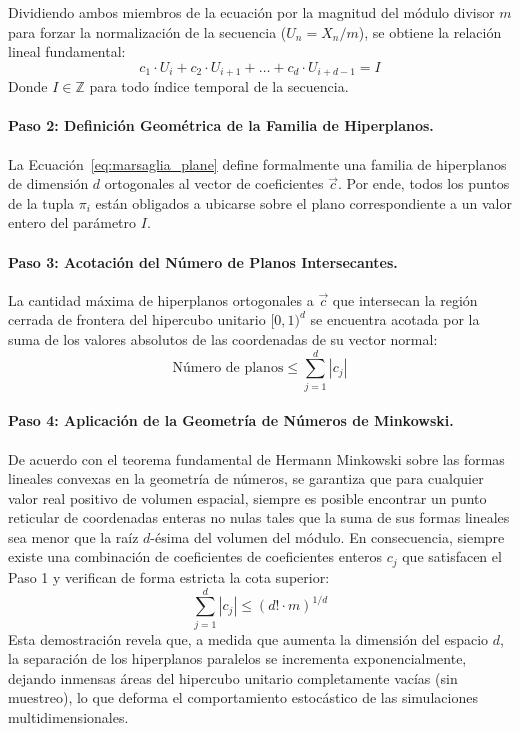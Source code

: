 \documentclass{article}
\begin{document}
Dividiendo ambos miembros de la ecuación por la magnitud del módulo divisor $m$ para forzar la normalización de la secuencia ($U_n = X_n / m$), se obtiene la relación lineal fundamental:
\begin{equation}
    c_1 \cdot U_i + c_2 \cdot U_{i+1} + \dots + c_d \cdot U_{i+d-1} = I
\label{eq:marsaglia_plane}
\end{equation}
Donde $I \in \mathbb{Z}$ para todo índice temporal de la secuencia.

\paragraph{Paso 2: Definición Geométrica de la Familia de Hiperplanos.}
La Ecuación~\ref{eq:marsaglia_plane} define formalmente una familia de hiperplanos de dimensión $d$ ortogonales al vector de coeficientes $\vec{c}$. Por ende, todos los puntos de la tupla $\pi_i$ están obligados a ubicarse sobre el plano correspondiente a un valor entero del parámetro $I$.

\paragraph{Paso 3: Acotación del Número de Planos Intersecantes.}
La cantidad máxima de hiperplanos ortogonales a $\vec{c}$ que intersecan la región cerrada de frontera del hipercubo unitario $[0, 1)^d$ se encuentra acotada por la suma de los valores absolutos de las coordenadas de su vector normal:
\begin{equation}
    \text{Número de planos} \le \sum_{j=1}^d |c_j|
\end{equation}

\paragraph{Paso 4: Aplicación de la Geometría de Números de Minkowski.}
De acuerdo con el teorema fundamental de Hermann Minkowski sobre las formas lineales convexas en la geometría de números, se garantiza que para cualquier valor real positivo de volumen espacial, siempre es posible encontrar un punto reticular de coordenadas enteras no nulas tales que la suma de sus formas lineales sea menor que la raíz $d$-ésima del volumen del módulo. En consecuencia, siempre existe una combinación de coeficientes de coeficientes enteros $c_j$ que satisfacen el Paso 1 y verifican de forma estricta la cota superior:
\begin{equation}
    \sum_{j=1}^d |c_j| \le (d! \cdot m)^{1/d}
\end{equation}
Esta demostración revela que, a medida que aumenta la dimensión del espacio $d$, la separación de los hiperplanos paralelos se incrementa exponencialmente, dejando inmensas áreas del hipercubo unitario completamente vacías (sin muestreo), lo que deforma el comportamiento estocástico de las simulaciones multidimensionales.
\end{document}
